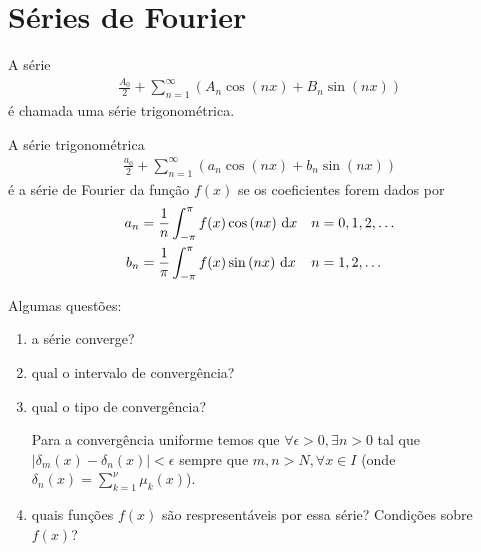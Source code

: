 % 
% 
% 
% 
% 
%
%
\chapter{S\'{e}ries de Fourier}
A s\'{e}rie
\begin{align*}
    \frac{A_0}{2} + \sum_{n = 1}^\infty \left( A_n \cos\left( n x \right) + B_n \sin\left( n x \right) \right)
\end{align*}
\'{e} chamada uma s\'{e}rie trigonom\'{e}trica.

\begin{defi}
    A s\'{e}rie trigonom\'{e}trica
    \begin{align*}
        \frac{a_0}{2} + \sum_{n = 1}^\infty \left( a_n \cos\left( n x \right) + b_n \sin\left( n x \right) \right)
    \end{align*}
    \'{e} a s\'{e}rie de Fourier da fun\c{c}\~{a}o $f(x)$ se os coeficientes forem dados por
    \begin{align*}
        a_n &= \frac{1}{n} \int_{-\pi}^\pi f(x) \cos\left( n x \right) \, \mathrm{d}x && n = 0, 1, 2, \ldots \\
        b_n &= \frac{1}{\pi} \int_{-\pi}^\pi f(x) \sin\left( n x \right) \, \mathrm{d}x && n = 1, 2, \ldots
    \end{align*}
\end{defi}

Algumas quest\~{o}es:
\begin{enumerate}
    \item a s\'{e}rie converge?
    \item qual o intervalo de converg\^{e}ncia?
    \item qual o tipo de converg\^{e}ncia?
        \begin{exem}
            Para a converg\^{e}ncia uniforme temos que $\forall \epsilon > 0, \exists n > 0$ tal que $| \delta_m(x) - \delta_n(x)| < \epsilon$ sempre que $m, n > N, \forall x \in I$ (onde $\delta_n(x) = \sum_{k = 1}^\nu \mu_k(x)$).
        \end{exem}
    \item quais fun\c{c}\~{o}es $f(x)$ s\~{a}o respresent\'{a}veis por essa s\'{e}rie? Condi\c{c}\~{o}es sobre $f(x)$?
\end{enumerate}

